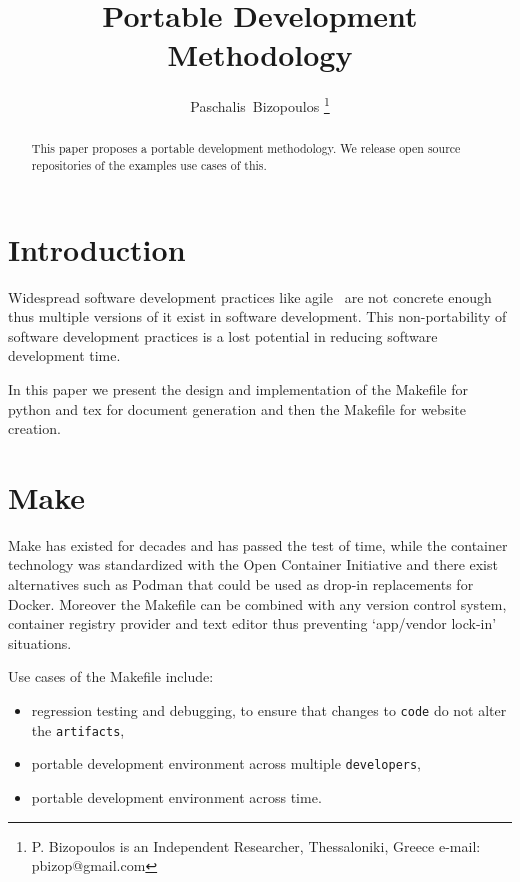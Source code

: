 \documentclass[journal]{IEEEtran}
\begin{document}
\title{Portable Development Methodology}

\author{Paschalis~Bizopoulos
\thanks{P. Bizopoulos is an Independent Researcher, Thessaloniki, Greece e-mail: pbizop@gmail.com}}

\maketitle

\begin{abstract}
	This paper proposes a portable development methodology.
	We release open source repositories of the examples use cases of this.
\end{abstract}

\section{Introduction}
Widespread software development practices like agile~\cite{abrahamsson2017agile} are not concrete enough thus multiple versions of it exist in software development.
This non-portability of software development practices is a lost potential in reducing software development time.

In this paper we present the design and implementation of the Makefile for python and tex for document generation and then the Makefile for website creation.

\section{Make}
Make has existed for decades and has passed the test of time, while the container technology was standardized with the Open Container Initiative and there exist alternatives such as Podman that could be used as drop-in replacements for Docker.
Moreover the Makefile can be combined with any version control system, container registry provider and text editor thus preventing `app/vendor lock-in' situations.

Use cases of the Makefile include:
\begin{itemize}
	\item regression testing and debugging, to ensure that changes to \texttt{code} do not alter the \texttt{artifacts},
	\item portable development environment across multiple \texttt{developers},
	\item portable development environment across time.
\end{itemize}
\end{document}
